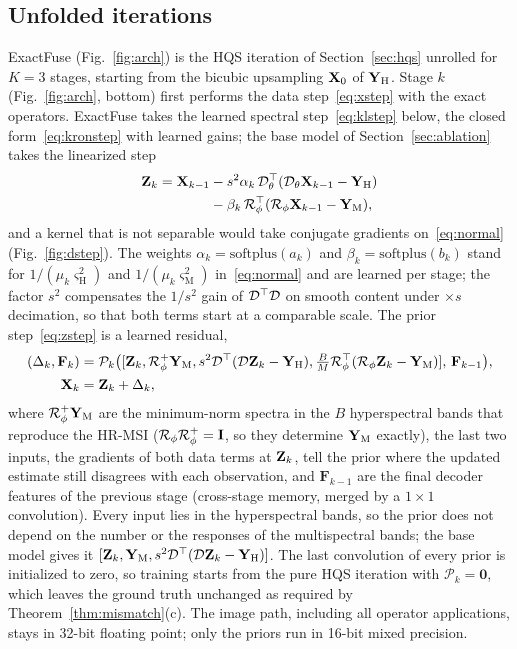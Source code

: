 \documentclass[journal]{IEEEtran}
\begin{document}
\subsection{Unfolded iterations}
ExactFuse (Fig.~\ref{fig:arch}) is the HQS iteration of Section~\ref{sec:hqs} unrolled for $K=3$ stages, starting from the bicubic upsampling $\mathbf{X}_0$ of $\mathbf{Y}_{\mathrm{H}}$. Stage $k$ (Fig.~\ref{fig:arch}, bottom) first performs the data step~\eqref{eq:xstep} with the exact operators. ExactFuse takes the learned spectral step~\eqref{eq:klstep} below, the closed form~\eqref{eq:kronstep} with learned gains; the base model of Section~\ref{sec:ablation} takes the linearized step
\begin{equation}
\begin{split}
\mathbf{Z}_k=\mathbf{X}_{k-1}&-s^2\alpha_k\,\mathcal{D}_\theta^{\top}(\mathcal{D}_\theta\mathbf{X}_{k-1}-\mathbf{Y}_{\mathrm{H}})\\
&-\beta_k\,\mathcal{R}_\phi^{\top}(\mathcal{R}_\phi\mathbf{X}_{k-1}-\mathbf{Y}_{\mathrm{M}}),
\end{split}
\label{eq:step}
\end{equation}
and a kernel that is not separable would take conjugate gradients on~\eqref{eq:normal} (Fig.~\ref{fig:dstep}). The weights $\alpha_k=\mathrm{softplus}(a_k)$ and $\beta_k=\mathrm{softplus}(b_k)$ stand for $1/(\mu_k\varsigma_{\mathrm{H}}^2)$ and $1/(\mu_k\varsigma_{\mathrm{M}}^2)$ in~\eqref{eq:normal} and are learned per stage; the factor $s^2$ compensates the $1/s^2$ gain of $\mathcal{D}^{\top}\mathcal{D}$ on smooth content under $\times s$ decimation, so that both terms start at a comparable scale. The prior step~\eqref{eq:zstep} is a learned residual,
\begin{equation}
\begin{split}
(\Delta_k,\mathbf{F}_k)&=\mathcal{P}_k\big([\mathbf{Z}_k,\mathcal{R}_\phi^{+}\mathbf{Y}_{\mathrm{M}},s^2\mathcal{D}^{\top}(\mathcal{D}\mathbf{Z}_k-\mathbf{Y}_{\mathrm{H}}),\tfrac{B}{M}\mathcal{R}_\phi^{\top}(\mathcal{R}_\phi\mathbf{Z}_k-\mathbf{Y}_{\mathrm{M}})],\,\mathbf{F}_{k-1}\big),\\
\mathbf{X}_k&=\mathbf{Z}_k+\Delta_k,
\end{split}
\label{eq:prior}
\end{equation}
where $\mathcal{R}_\phi^{+}\mathbf{Y}_{\mathrm{M}}$ are the minimum-norm spectra in the $B$ hyperspectral bands that reproduce the HR-MSI ($\mathcal{R}_\phi\mathcal{R}_\phi^{+}=\mathbf{I}$, so they determine $\mathbf{Y}_{\mathrm{M}}$ exactly), the last two inputs, the gradients of both data terms at $\mathbf{Z}_k$, tell the prior where the updated estimate still disagrees with each observation, and $\mathbf{F}_{k-1}$ are the final decoder features of the previous stage (cross-stage memory, merged by a $1\times1$ convolution). Every input lies in the hyperspectral bands, so the prior does not depend on the number or the responses of the multispectral bands; the base model gives it $[\mathbf{Z}_k,\mathbf{Y}_{\mathrm{M}},s^2\mathcal{D}^{\top}(\mathcal{D}\mathbf{Z}_k-\mathbf{Y}_{\mathrm{H}})]$. The last convolution of every prior is initialized to zero, so training starts from the pure HQS iteration with $\mathcal{P}_k=\mathbf{0}$, which leaves the ground truth unchanged as required by Theorem~\ref{thm:mismatch}(c). The image path, including all operator applications, stays in 32-bit floating point; only the priors run in 16-bit mixed precision.
\end{document}

